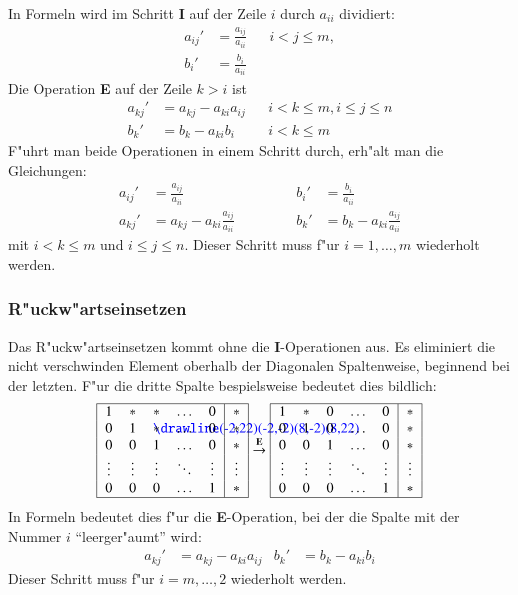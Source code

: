 In Formeln wird im Schritt {\bf I} auf der Zeile $i$
durch $a_{ii}$ dividiert:
\begin{align*}
a_{ij}'&=\frac{a_{ij}}{a_{ii}}&& i < j \le m,\\
b_i'&=\frac{b_i}{a_{ii}}
\end{align*}
Die Operation {\bf E} auf der Zeile $k>i$ ist
\begin{align*}
a_{kj}'&=a_{kj}-a_{ki}a_{ij}&&i < k \le m, i \le j\le n\\
b_k'&=b_k-a_{ki}b_i&&i < k \le m
\end{align*}
F"uhrt man beide Operationen in einem Schritt durch, erh"alt man die
Gleichungen:
\begin{equation}
\begin{aligned}
a_{ij}'&=\frac{a_{ij}}{a_{ii}}&&&b_i'&=\frac{b_i}{a_{ii}}\\
a_{kj}'&=a_{kj}-a_{ki}\frac{a_{ij}}{a_{ii}}&
&\qquad&b_k'&=b_k-a_{ki}\frac{a_{ij}}{a_{ii}}
\end{aligned}
\label{vorwaertsreduktion}
\end{equation}
mit $i < k\le m$ und $i\le j\le n$. Dieser Schritt muss f"ur $i=1,\dots,m$
wiederholt werden.

\subsubsection{R"uckw"artseinsetzen}
Das R"uckw"artseinsetzen kommt ohne die {\bf I}-Operationen aus.
Es eliminiert die nicht verschwinden Element oberhalb der Diagonalen
Spaltenweise, beginnend bei der letzten.
F"ur die dritte Spalte bespielsweise bedeutet dies bildlich:
\begin{gather*}
\begin{tabular}{|>{$}c<{$}>{$}c<{$}>{$}c<{$}>{$}c<{$}>{$}c<{$}|>{$}c<{$}|}
\hline
1&*&*&\dots&0&*\\
0&1&\begin{picture}(0,0)
\color{blue}\drawline(-2,22)(-2,-2)(8,-2)(8,22)
\end{picture}%
*&\dots&0&*\\
0&0&1&\dots&0&*\\
\vdots&\vdots& \vdots& \ddots& \vdots&\vdots\\
0&0&0&\dots&1&*\\
\hline
\end{tabular}
\overset{\text{\bf E}}\rightarrow
\begin{tabular}{|>{$}c<{$}>{$}c<{$}>{$}c<{$}>{$}c<{$}>{$}c<{$}|>{$}c<{$}|}
\hline
1&*&0&\dots&0&*\\
0&1&0&\dots&0&*\\
0&0&1&\dots&0&*\\
\vdots& \vdots&\vdots& \ddots& \vdots&\vdots\\
0&0&0&\dots&1&*\\
\hline
\end{tabular}
\end{gather*}
In Formeln bedeutet dies f"ur die {\bf E}-Operation, bei der die
Spalte mit der Nummer $i$ ``leerger"aumt'' wird:
\begin{align}
a_{kj}'&=a_{kj}- a_{ki} a_{ij}
&
b_k'&=b_k- a_{ki}b_i
\label{rueckwaertseinsetzen}
\end{align}
Dieser Schritt muss f"ur $i=m,\dots,2$ wiederholt werden.
